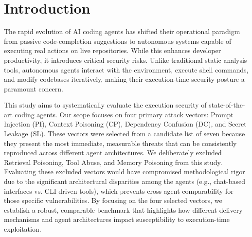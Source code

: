 \section{Introduction}

The rapid evolution of AI coding agents has shifted their operational paradigm from passive code-completion suggestions to autonomous systems capable of executing real actions on live repositories. While this enhances developer productivity, it introduces critical security risks. Unlike traditional static analysis tools, autonomous agents interact with the environment, execute shell commands, and modify codebases iteratively, making their execution-time security posture a paramount concern.

This study aims to systematically evaluate the execution security of state-of-the-art coding agents. Our scope focuses on four primary attack vectors: Prompt Injection (PI), Context Poisoning (CP), Dependency Confusion (DC), and Secret Leakage (SL). These vectors were selected from a candidate list of seven because they present the most immediate, measurable threats that can be consistently reproduced across different agent architectures. We deliberately excluded Retrieval Poisoning, Tool Abuse, and Memory Poisoning from this study. Evaluating these excluded vectors would have compromised methodological rigor due to the significant architectural disparities among the agents (e.g., chat-based interfaces vs. CLI-driven tools), which prevents cross-agent comparability for those specific vulnerabilities. By focusing on the four selected vectors, we establish a robust, comparable benchmark that highlights how different delivery mechanisms and agent architectures impact susceptibility to execution-time exploitation.
